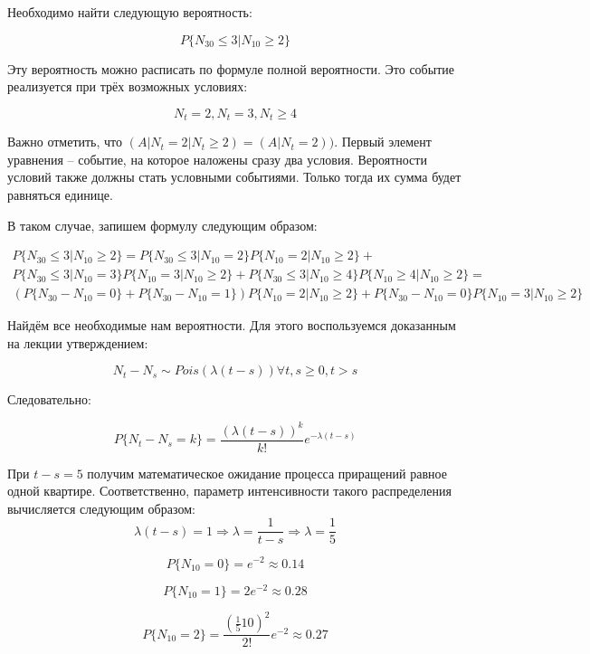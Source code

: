 \documentclass[a4paper,12pt]{article}
\begin{document}
Необходимо найти следующую вероятность: 

\[ P\{ N_{30} \le 3 | N_{10} \ge 2 \} \]

Эту вероятность можно расписать по формуле полной вероятности. Это событие реализуется при трёх возможных условиях:

\[ N_t = 2, N_t = 3, N_t \ge 4 \]

Важно отметить, что $ (A|N_t = 2 | N_t \ge 2) = (A|N_t = 2)) $. Первый элемент уравнения -- событие, на которое наложены сразу два условия. Вероятности условий также должны стать условными событиями. Только тогда их сумма будет равняться единице.



В таком случае, запишем формулу следующим образом:

\begin{equation}
\begin{aligned}
P\{ N_{30} \le 3 | N_{10} \ge 2 \}  = P\{ N_{30} \le 3 | N_{10} = 2 \} P\{ N_{10} = 2 | N_{10} \ge 2 \} + & \\ P\{ N_{30} \le 3 | N_{10} = 3 \} P\{ N_{10} = 3 | N_{10} \ge 2 \} + P\{ N_{30} \le 3 | N_{10} \ge 4 \} P\{ N_{10} \ge 4 | N_{10} \ge 2 \} = & \\(P\{ N_{30} - N_{10} = 0 \} + P\{ N_{30} - N_{10} = 1 \}) P\{ N_{10} = 2 | N_{10} \ge 2 \} + P\{ N_{30} - N_{10} = 0 \} P\{ N_{10} = 3 | N_{10} \ge 2 \}
\end{aligned}
\end{equation}

Найдём все необходимые нам вероятности. Для этого воспользуемся доказанным на лекции утверждением:

\[ N_t - N_s \sim Pois(\lambda(t - s)) \forall t,s \ge 0, t > s \]

Следовательно:

\[ P\{ N_t - N_s = k \} = \frac{(\lambda(t-s))^k}{k!}e^{-\lambda(t-s)}\]



При $ t - s = 5 $ получим математическое ожидание процесса приращений равное одной квартире. Соответственно, параметр интенсивности такого распределения вычисляется следующим образом:
\[  \lambda(t - s) = 1 \Rightarrow \lambda = \frac{1}{t-s} \Rightarrow \lambda = \frac{1}{5}\]


\[ P\{N_{10} = 0 \} =  e^{-2}  \approx 0.14\]

\[ P\{N_{10} = 1 \} =  2e^{-2}  \approx 0.28\]

\[ P\{N_{10} = 2 \} = \frac{(\frac{1}{5} 10)^2}{2!} e^{-2}  \approx 0.27\]
\end{document}

